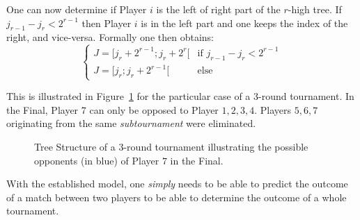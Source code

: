 \documentclass[a4paper,9pt]{report}
\theoremstyle{mytheor}
\begin{document}
One can now determine if Player $i$ is the left of right part of the $r$-high tree.
If $j_{r-1} - j_{r} < 2^{r-1}$ then Player $i$ is in the left part and one keeps the
index of the right, and vice-versa.
Formally one then obtains:
\begin{equation}
  \begin{cases}
    J = [j_{r} + 2^{r-1};  j_{r} + 2^{r}[ & \text{if $j_{r-1} - j_{r} < 2^{r-1}$} \\
    J = [j_{r} ; j_{r} + 2^{r-1}[ & \text{else}
  \end{cases}
\end{equation}

This is illustrated in Figure~\ref{fig:tree} for the particular case of a 3-round tournament.
In the Final, Player 7 can only be opposed to Player ${1, 2, 3, 4}$. Players ${5, 6, 7}$
originating from the same \textit{subtournament} were eliminated.


\begin{figure}[h]
  \centering
\caption{Tree Structure of a 3-round tournament illustrating the possible opponents (in blue)
of Player $7$ in the Final.}
\label{fig:tree}
\end{figure}

With the established model, one \textit{simply} needs to be able to predict the outcome of a match between
two players to be able to determine the outcome of a whole tournament.
\end{document}
